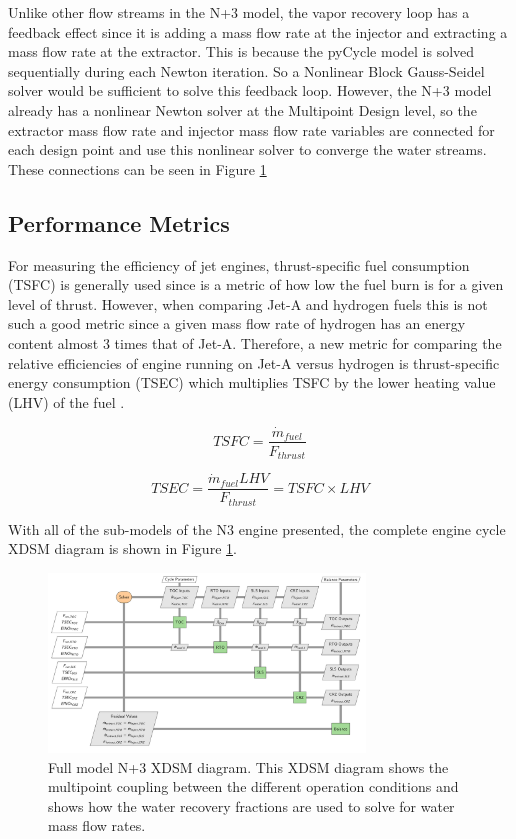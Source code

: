 \documentclass[conf]{new-aiaa}
\begin{document}
\noindent
Unlike other flow streams in the N+3 model, the vapor recovery loop has a feedback effect since it is adding a mass flow rate at the injector and extracting a mass flow rate at the extractor.
This is because the pyCycle model is solved sequentially during each Newton iteration.
So a Nonlinear Block Gauss-Seidel solver would be sufficient to solve this feedback loop.
However, the N+3 model already has a nonlinear Newton solver at the Multipoint Design level, so the extractor mass flow rate and injector mass flow rate variables are connected for each design point and use this nonlinear solver to converge the water streams.
These connections can be seen in Figure \ref{fig:N3_xdsm_full}


\subsection{Performance Metrics}
For measuring the efficiency of jet engines, thrust-specific fuel consumption (TSFC) is generally used since is a metric of how low the fuel burn is for a given level of thrust.
However, when comparing Jet-A and hydrogen fuels this is not such a good metric since a given mass flow rate of hydrogen has an energy content almost 3 times that of Jet-A.
Therefore, a new metric for comparing the relative efficiencies of engine running on Jet-A versus hydrogen is thrust-specific energy consumption (TSEC) which multiplies TSFC by the lower heating value (LHV) of the fuel \cite{Adler2022d}.

\begin{equation}
    TSFC = \frac{\Dot{m}_{fuel}}{F_{thrust}}
\end{equation}

\begin{equation}
    TSEC = \frac{\Dot{m}_{fuel} LHV}{F_{thrust}} = TSFC \times LHV
\end{equation}

\noindent
With all of the sub-models of the N3 engine presented, the complete engine cycle XDSM diagram is shown in Figure \ref{fig:N3_xdsm_full}.

\begin{figure}[!hbt]
    \centering
    \includegraphics[width=0.75\textwidth]{N3_xdsm_full.pdf}
    \caption{
        Full model N+3 XDSM diagram.
        This XDSM diagram shows the multipoint coupling between the different operation conditions and shows how the water recovery fractions are used to solve for water mass flow rates.
    }
    \label{fig:N3_xdsm_full}
\end{figure}
\end{document}
